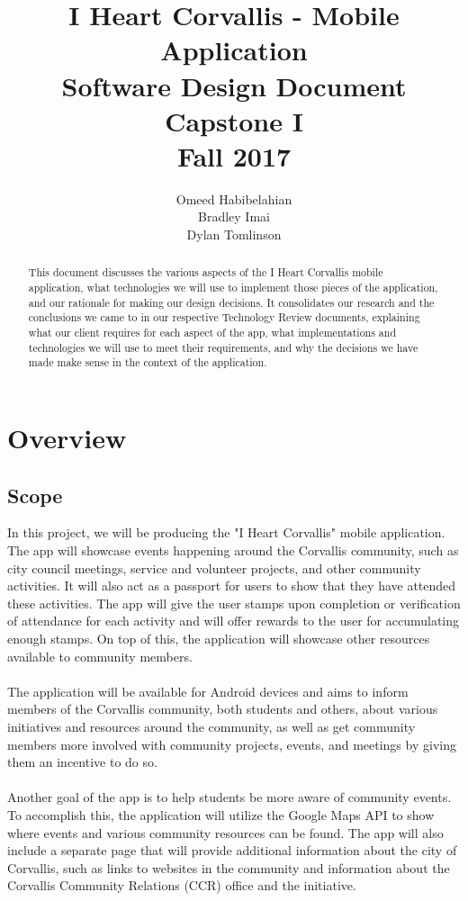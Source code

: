 \documentclass[draftclsnofoot, onecolumn, 10pt, compsoc]{IEEEtran}
\title{\textbf{I Heart Corvallis - Mobile Application\\Software Design Document}\\Capstone I\\Fall 2017}
\author{Omeed Habibelahian\\Bradley Imai\\Dylan Tomlinson}
\begin{document}
	\maketitle
	\begin{abstract}
		This document discusses the various aspects of the I Heart Corvallis mobile application, what technologies we will use to implement those pieces of the application, and our rationale for making our design decisions. It consolidates our research and the conclusions we came to in our respective Technology Review documents, explaining what our client requires for each aspect of the app, what implementations and technologies we will use to meet their requirements, and why the decisions we have made make sense in the context of the application.
	\end{abstract}
	\newpage

	\tableofcontents
	\newpage

	\section{Overview}
		\subsection{Scope}
			In this project, we will be producing the "I Heart Corvallis" mobile application. The app will showcase events happening around the Corvallis community, such as city council meetings, service and volunteer projects, and other community activities. It will also act as a passport for users to show that they have attended these activities. The app will give the user stamps upon completion or verification of attendance for each activity and will offer rewards to the user for accumulating enough stamps. On top of this, the application will showcase other resources available to community members. \\ \\
			The application will be available for Android devices and aims to inform members of the Corvallis community, both students and others, about various initiatives and resources around the community, as well as get community members more involved with community projects, events, and meetings by giving them an incentive to do so. \\ \\
			Another goal of the app is to help students be more aware of community events. To accomplish this, the application will utilize the Google Maps API to show where events and various community resources can be found. The app will also include a separate page that will provide additional information about the city of Corvallis, such as links to websites in the community and information about the Corvallis Community Relations (CCR) office and the initiative.
\end{document}
